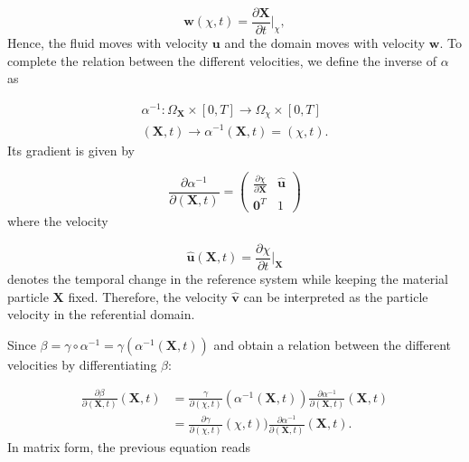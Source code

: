 \documentclass[a4paper,11pt,oneside]{book}
\begin{document}
\begin{equation}
\mathbf{w}(\chi, t) = \frac{\partial \mathbf{X}}{\partial t} {\Big |}_\chi,
\end{equation}
Hence, the fluid moves with velocity $\mathbf{u}$ and the domain moves with velocity $\mathbf{w}$. To complete the relation between the different velocities, we define the inverse of $\alpha$ as

\begin{align*}
\alpha^{-1} : \Omega_{\mathbf{X}} \times [0, T]  \rightarrow \Omega_\chi \times [0, T] \\
(\mathbf{X} , t)  \rightarrow \alpha^{-1}(\mathbf{X}, t) = (\chi, t).
\end{align*}
Its gradient is given by

\begin{equation}
\frac{\partial \alpha^{-1}}{\partial(\mathbf{X}, t)} = 
\begin{pmatrix}
\frac{\partial \chi}{\partial \mathbf{X}} & \hat{\mathbf{u}}\\
\mathbf{0}^T & 1
\end{pmatrix}
\end{equation}
where the velocity

\begin{equation}
\label{eq:ale:4}
\hat{\mathbf{u}} (\mathbf{X},t) = \frac{\partial \chi}{\partial t} {\Big |}_{\mathbf{X}}
\end{equation}
denotes the temporal change in the reference system while keeping the material particle $\mathbf{X}$ fixed. Therefore, the velocity $\mathbf{\hat{v}}$ can be interpreted as the particle velocity in the referential domain.

Since $\beta = \gamma \circ \alpha^{-1} = \gamma(\alpha^{-1}(\mathbf{X},t))$ and obtain a relation between the different velocities by differentiating $\beta$:

\begin{align*}
\frac{\partial \beta}{\partial (\mathbf{X},t)} (\mathbf{X},t)
& = \frac{\gamma}{\partial (\chi, t)}(\alpha^{-1}(\mathbf{X},t)) \frac{\partial \alpha^{-1}}{\partial(\mathbf{X},t)}(\mathbf{X},t) \\
& = \frac{\partial \gamma}{\partial (\chi, t)}(\chi,t)) \frac{\partial \alpha^{-1}}{\partial(\mathbf{X},t)}(\mathbf{X},t).
\end{align*}
In matrix form, the previous equation reads
\end{document}

